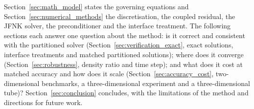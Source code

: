 Section~\ref{sec:math_model} states the governing equations and Section~\ref{sec:numerical_methods} the discretisation, the coupled residual, the JFNK solver, the preconditioner and the interface treatment.
The following sections each answer one question about the method: is it correct and consistent with the partitioned solver (Section~\ref{sec:verification_exact}, exact solutions, interface treatments and matched partitioned solutions); where does it converge (Section~\ref{sec:robustness}, density ratio and time step); and what does it cost at matched accuracy and how does it scale (Section~\ref{sec:accuracy_cost}, two-dimensional benchmarks, a three-dimensional experiment and a three-dimensional tube)?
Section~\ref{sec:conclusion} concludes, with the limitations of the method and directions for future work.
